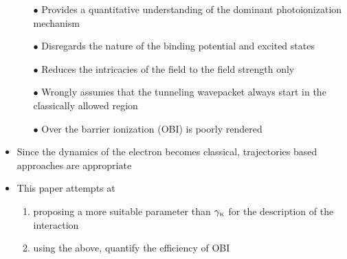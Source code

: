 \begin{frame}
\begin{textblock*}{400pt}
\begin{itemize}
\begin{itemize}
\footnotesize
 \item[$\bullet$] Provides a quantitative understanding of the dominant
photoionization mechanism
\end{itemize}
\begin{itemize}
\footnotesize
 \item[$\bullet$] Disregards the nature of the binding potential
and excited states
 \item[$\bullet$] Reduces the intricacies of the field to 
the field strength only
 \item[$\bullet$] Wrongly assumes that the tunneling wavepacket 
always start in the classically allowed region
 \item[$\bullet$] Over the barrier ionization (OBI) is poorly rendered
\end{itemize}
\vspace{10pt}
\item Since the dynamics of the electron becomes classical, 
trajectories based approaches are appropriate 
\vspace{5pt}
\item This paper attempts at 
\begin{enumerate}
\footnotesize
\item proposing a more suitable parameter 
than $\gamma_{\mbox{\tiny$\rm K$}}$ for the description of the interaction
\item using the above, quantify the efficiency of OBI 
\end{enumerate}

\end{itemize}
\end{textblock*}



\end{frame}



